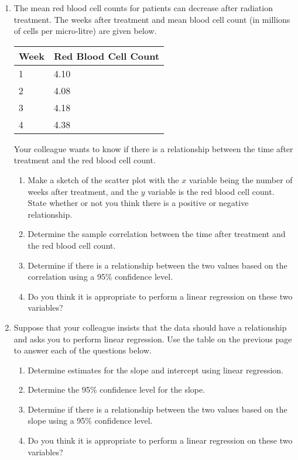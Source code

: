 \documentclass[12pt]{article}
\begin{document}
\begin{enumerate}
\clearpage

\item The mean red blood cell counts for patients can decrease after
  radiation treatment. The weeks after treatment and mean blood cell
  count (in millions of cells per micro-litre) are given below.

\begin{tabular}{l|l}
  Week & Red Blood Cell Count \\ \hline
  1 & 4.10 \\
  2 & 4.08 \\
  3 & 4.18 \\
  4 & 4.38
\end{tabular}

Your colleague wants to know if there is a relationship between the
time after treatment and the red blood cell count.

  \begin{enumerate}
  \item Make a sketch of the scatter plot with the $x$ variable being
    the number of weeks after treatment, and the $y$ variable is the
    red blood cell count. State whether or not you think there is a
    positive or negative relationship.  
    \vfill

  \item Determine the sample correlation between the time after
    treatment and the red blood cell count. 
    \vfill

  \item Determine if there is a relationship between the two values
    based on the correlation using a 95\% confidence level.
    \vfill

  \item Do you think it is appropriate to perform a linear regression
    on these two variables?
  \end{enumerate}

  \clearpage

\item Suppose that your colleague insists that the data should have a
  relationship and asks you to perform linear regression. Use the
  table on the previous page to answer each of the questions below.

  \begin{enumerate}
  \item Determine estimates for the slope and intercept using linear
    regression. 
    \vfill
  \item Determine the 95\% confidence level for the slope.
    \vfill
  \item Determine if there is a relationship between the two values
    based on the slope using a 95\% confidence level.  
    \vfill

  \item Do you think it is appropriate to perform a linear regression
    on these two variables?
  \end{enumerate}


\end{enumerate}
\end{document}
